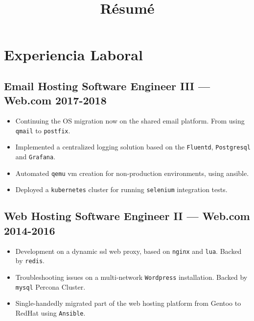 \documentclass[11pt]{article}
\begin{document}
\title{R\'esum\'e}
\author{\FULLNAME}



\section{Experiencia Laboral}


\subsection{Email Hosting Software Engineer III --- Web.com \hfill 2017-2018}
\begin{itemize}
\item Continuing the OS migration now on the shared email platform. From using \texttt{qmail} to \texttt{postfix}.
\item Implemented a centralized logging solution based on the \texttt{Fluentd}, \texttt{Postgresql} and \texttt{Grafana}.
\item Automated \texttt{qemu} vm creation for non-production environments, using ansible.
\item Deployed a \texttt{kubernetes} cluster for running \texttt{selenium} integration tests.
\end{itemize}

\subsection{Web Hosting Software Engineer II --- Web.com \hfill 2014-2016}
\begin{itemize}
\item Development on a dynamic ssl web proxy, based on \texttt{nginx} and \texttt{lua}. Backed by \texttt{redis}.
\item Troubleshooting issues on a multi-network \texttt{Wordpress} installation. Backed by \texttt{mysql} Percona Cluster.
\item Single-handedly migrated part of the web hosting platform from Gentoo to RedHat using \texttt{Ansible}.
\end{itemize}
\end{document}
